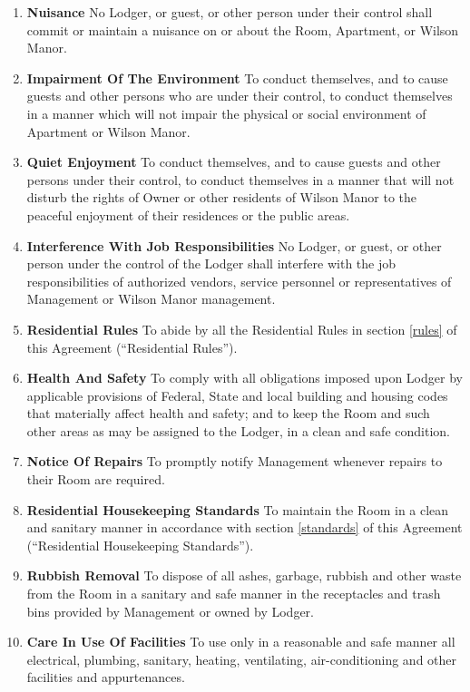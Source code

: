 \documentclass[12pt,letterpaper]{article}
\newcommand{\lodger}{Lodger}
\newcommand{\rules}{Residential Rules}
\newcommand{\standards}{Residential Housekeeping Standards}
\newcommand{\management}{Management}
\newcommand{\condo}{Wilson Manor}
\newcommand{\apt}{Apartment}
\newcommand{\room}{Room}
\begin{document}
\begin{enumerate}
		\begin{enumerate}
			\item \textbf{Nuisance} \quad No \lodger{}, or guest, or other person under their control shall commit or maintain a nuisance on or about the \room{}, \apt{}, or \condo{}. 
			\item \textbf{Impairment Of The Environment} \quad To conduct themselves, and to cause guests and other persons who are under their control, to conduct themselves in a manner which will not impair the physical or social environment of \apt{} or \condo{}. 
			\item \textbf{Quiet Enjoyment} \quad To conduct themselves, and to cause guests and other persons under their control, to conduct themselves in a manner that will not disturb the rights of Owner or other residents of \condo{} to the peaceful enjoyment of their residences or the public areas. 
			\item \textbf{Interference With Job Responsibilities} \quad No \lodger{}, or guest, or other person under the control of the \lodger{} shall interfere with the job responsibilities of authorized vendors, service personnel or representatives of \management{} or \condo{} management. 
			\item \textbf{\rules{}} \quad To abide by all the \rules{} in section \ref{rules} of this Agreement (``\rules'').
			\item \textbf{Health And Safety} \quad To comply with all obligations imposed upon \lodger{} by applicable provisions of Federal, State and local building and housing codes that materially affect health and safety; and to keep the \room{} and such other areas as may be assigned to the \lodger{}, in a clean and safe condition. 
			\item \textbf{Notice Of Repairs} \quad To promptly notify \management{} whenever repairs to their \room{} are required. 
			\item \textbf{\standards{}} \quad To maintain the \room{} in a clean and sanitary manner in accordance with section \ref{standards} of this Agreement (``\standards{}'').
			\item \textbf{Rubbish Removal} \quad To dispose of all ashes, garbage, rubbish and other waste from the \room{} in a sanitary and safe manner in the receptacles and trash bins provided by \management{} or owned by \lodger{}. 
			\item \textbf{Care In Use Of Facilities} \quad To use only in a reasonable and safe manner all electrical, plumbing, sanitary, heating, ventilating, air-conditioning and other facilities and appurtenances. 

\end{enumerate}
\end{enumerate}
\end{document}
